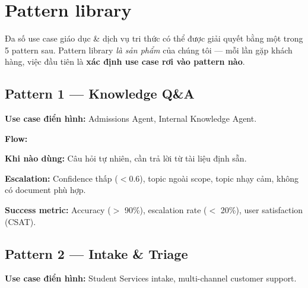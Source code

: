 \documentclass[11pt,a4paper]{article}
\begin{document}
\section{Pattern library}

Đa số use case giáo dục \& dịch vụ tri thức có thể được giải quyết bằng một
trong 5 pattern sau. Pattern library \textit{là sản phẩm} của chúng tôi --- mỗi
lần gặp khách hàng, việc đầu tiên là \textbf{xác định use case rơi vào pattern
nào}.

\subsection{Pattern 1 — Knowledge Q\&A}

\textbf{Use case điển hình:} Admissions Agent, Internal Knowledge Agent.

\textbf{Flow:}

\begin{center}
\end{center}

\textbf{Khi nào dùng:} Câu hỏi tự nhiên, cần trả lời từ tài liệu định sẵn.

\textbf{Escalation:} Confidence thấp ($< 0.6$), topic ngoài scope, topic nhạy cảm, không có document phù hợp.

\textbf{Success metric:} Accuracy ($>$ 90\%), escalation rate ($<$ 20\%), user satisfaction (CSAT).

\subsection{Pattern 2 — Intake \& Triage}

\textbf{Use case điển hình:} Student Services intake, multi-channel customer support.
\end{document}
